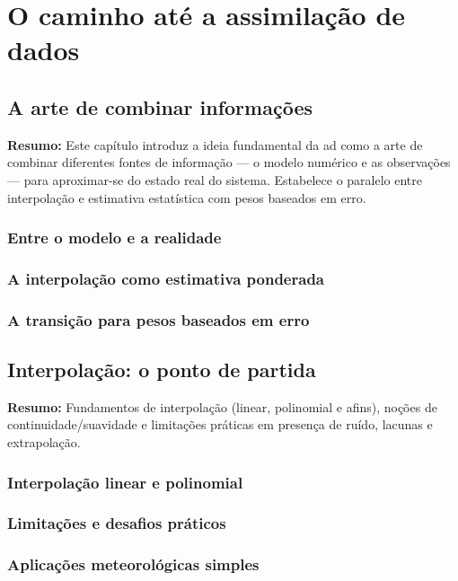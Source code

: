 \documentclass[12pt,a4paper,oneside]{book}
\begin{document}
\mainmatter

\part{O caminho até a assimilação de dados}

\chapter{A arte de combinar informações}
\noindent\textbf{Resumo:} Este capítulo introduz a ideia fundamental da \gls{ad} como a arte de combinar diferentes fontes de informação — o modelo numérico e as observações — para aproximar-se do estado real do sistema. Estabelece o paralelo entre interpolação e estimativa estatística com pesos baseados em erro.
\section{Entre o modelo e a realidade}
\section{A interpolação como estimativa ponderada}
\section{A transição para pesos baseados em erro}

\chapter{Interpolação: o ponto de partida}
\noindent\textbf{Resumo:} Fundamentos de interpolação (linear, polinomial e afins), noções de continuidade/suavidade e limitações práticas em presença de ruído, lacunas e extrapolação.
\section{Interpolação linear e polinomial}
\section{Limitações e desafios práticos}
\section{Aplicações meteorológicas simples}
\end{document}
